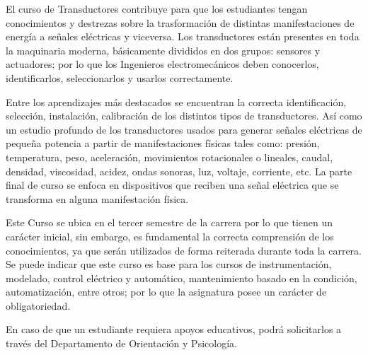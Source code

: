 \documentclass[letterpaper]{article}%
\begin{document}
\begin{tcolorbox}[
blanker,
width=0.78\textwidth,enlarge left by=0.24\textwidth,
before skip=6pt,
breakable,
overlay unbroken and first={%
    \node[inner sep=0pt,outer sep=0pt,text width=0.22\textwidth,
    align=none,
    below right]
    at ([xshift=-0.24\textwidth]frame.north west)
{
\hspace*{0mm}\fontsize{12}{14}\selectfont \textbf{\textcolor{parte}{2 Descripción general}}
};}]
El curso de Transductores contribuye para que los estudiantes tengan conocimientos y destrezas sobre la trasformación de distintas manifestaciones de energía a señales eléctricas y viceversa. Los transductores están presentes en toda la maquinaria moderna, básicamente divididos en dos grupos: sensores y actuadores; por lo que los Ingenieros electromecánicos deben conocerlos, identificarlos, seleccionarlos y usarlos correctamente.

Entre los aprendizajes más destacados se encuentran la correcta identificación, selección, instalación, calibración de los distintos tipos de transductores.  Así como un estudio profundo de los transductores usados para generar señales eléctricas de pequeña potencia a partir de manifestaciones físicas tales como: presión, temperatura, peso, aceleración, movimientos rotacionales o lineales, caudal, densidad, viscosidad, acidez, ondas sonoras, luz, voltaje, corriente, etc. La parte final de curso se enfoca en dispositivos que reciben una señal eléctrica que se transforma en alguna manifestación física.

Este Curso se ubica en el tercer semestre de la carrera por lo que tienen un carácter inicial, sin embargo, es fundamental la correcta comprensión de los conocimientos, ya que serán utilizados de forma reiterada durante toda la carrera. Se puede indicar que este curso es base para los cursos de instrumentación, modelado, control eléctrico y automático, mantenimiento basado en la condición, automatización, entre otros; por lo que la asignatura posee un carácter de obligatoriedad.

En caso de que un estudiante requiera apoyos educativos, podrá solicitarlos a través del Departamento de Orientación y Psicología. 
\end{tcolorbox}
%
\vspace*{10mm}%
\end{document}
